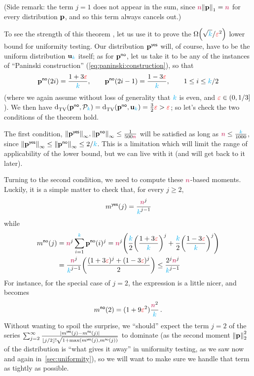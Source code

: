 \noindent (Side remark: the term $j=1$ does not appear in the sum, since $\ns\norm{\p}_1=\ns$ for every distribution $\mathbf{p}$, and so this term always cancels out.)\medskip

To see the strength of this theorem , let us use it to prove the $\bigOmega{\sqrt{\ab}/\dst^2}$ lower bound for uniformity testing. Our distribution $\mathbf{p}^{\sf{}yes}$ will, of course, have to be the uniform distribution $\mathbf{u}_{\textcolor{cyan}{k}}$ itself; as for $\mathbf{p}^{{\sf{}no}}$, let us take it to be any of the instances of ``Paninski construction'' (\cref{eq:paninski:construction}), so that
\[
	\mathbf{p}^{{\sf{}no}}(2i) = \frac{1+3\textcolor{red}{\varepsilon}}{{\textcolor{cyan}{k}}}, \qquad \mathbf{p}^{{\sf{}no}}(2i-1) = \frac{1-3\textcolor{red}{\varepsilon}}{{\textcolor{cyan}{k}}}, \qquad 1\leq i\leq {\textcolor{cyan}{k}}/2
\]
(where we again assume without loss of generality that ${\textcolor{cyan}{k}}$ is even, and $\textcolor{red}{\varepsilon}\in(0,1/3]$). We then have 
$\totalvardist{\p^\no}{\property_\ab}=\totalvardist{\p^\no}{\uniform_\ab}= \frac{3}{2}\dst > \dst$; so let's check the two conditions of the theorem hold. 

The first condition, 
$\norminf{\p^\yes},\norminf{\p^\no} \leq \frac{1}{500\ns}$
will be satisfied as long as ${\textcolor{purple}{n}} \leq \frac{{\textcolor{cyan}{k}}}{1000}$, since $\norminf{\p^\yes}\leq \norminf{\p^\no} \leq 2/\ab$. This is a limitation which will limit the range of applicability of the lower bound, but we can live with it (and will get back to it later).

Turning to the second condition, we need to compute these ${\textcolor{purple}{n}}$-based moments. Luckily, it is a simple matter to check that, for every $j\geq 2$,
\begin{equation}
	\label{eq:moments:yes}
	m^{{\sf{}yes}}(j) = \frac{{\textcolor{purple}{n}}^j}{{\textcolor{cyan}{k}}^{j-1}}
\end{equation}
while
\begin{align}
	m^{\no}(j) 
	&= \ns^j \sum_{i=1}^\ab \p^{\no}(i)^j 
	= \ns^j\Paren{ \frac{\ab}{2} \Paren{\frac{1+3\dst}{\ab}}^j + \frac{\ab}{2} \Paren{\frac{1-3\dst}{\ab}}^j } \notag\\
	&= \frac{\ns^j}{\ab^{j-1}}\Paren{ \frac{(1+3\dst)^j + (1-3\dst)^j}{2} }
	\leq \frac{2^j\ns^j}{\ab^{j-1}} \label{eq:moments:no}
\end{align}
For instance, for the special case of $j=2$, the expression is a little nicer, and becomes
\begin{equation}
	m^{{\sf{}no}}(2)
	= (1+9\textcolor{red}{\varepsilon}^2)\frac{{\textcolor{purple}{n}}^2}{{\textcolor{cyan}{k}}}\,.
\end{equation}
Without wanting to spoil the surprise, we ``should'' expect the term $j=2$ of the series $\sum_{j=2}^\infty \frac{\abs{m^{\yes}(j)-m^{\no}(j)}}{\flr{j/2}!\sqrt{1+\max(m^{\yes}(j),m^{\no}(j))}}$ to dominate (as the second moment $\normtwo{\p}^2$ of the distribution is ``what gives it away'' in uniformity testing, as we saw now and again in~\cref{sec:uniformity}), so we will want to make sure we handle that term as tightly as possible.

